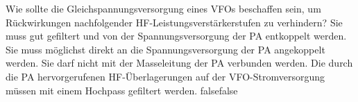     {Wie sollte die Gleichspannungsversorgung eines VFOs beschaffen sein, um Rückwirkungen nachfolgender HF-Leistungsverstärkerstufen zu verhindern?}
    {Sie muss gut gefiltert und von der Spannungsversorgung der PA entkoppelt werden.}
    {Sie muss möglichst direkt an die Spannungsversorgung der PA angekoppelt werden.}
    {Sie darf nicht mit der Masseleitung der PA verbunden werden.}
    {Die durch die PA hervorgerufenen HF-Überlagerungen auf der VFO-Stromversorgung müssen mit einem Hochpass gefiltert werden.}
    {false}{false}